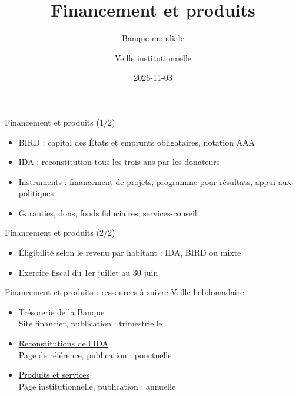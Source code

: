 \documentclass[aspectratio=169,11pt]{beamer}
\title{Financement et produits}
\subtitle{Banque mondiale}
\author{Veille institutionnelle}
\date{2026-11-03}
\begin{document}
\begin{frame}\titlepage\end{frame}

\begin{frame}{Financement et produits (1/2)}
\begin{itemize}
\item BIRD : capital des États et emprunts obligataires, notation AAA
\item IDA : reconstitution tous les trois ans par les donateurs
\item Instruments : financement de projets, programme-pour-résultats, appui aux politiques
\item Garanties, dons, fonds fiduciaires, services-conseil
\end{itemize}
\end{frame}

\begin{frame}{Financement et produits (2/2)}
\begin{itemize}
\item Éligibilité selon le revenu par habitant : IDA, BIRD ou mixte
\item Exercice fiscal du 1er juillet au 30 juin
\end{itemize}
\end{frame}

\begin{frame}{Financement et produits : ressources à suivre}
\small
Veille hebdomadaire.
\begin{itemize}
\item \href{https://treasury.worldbank.org}{Trésorerie de la Banque}\\{\footnotesize Site financier, publication : trimestrielle}
\item \href{https://ida.worldbank.org/en/replenishments}{Reconstitutions de l'IDA}\\{\footnotesize Page de référence, publication : ponctuelle}
\item \href{https://www.worldbank.org/en/projects-operations/products-and-services}{Produits et services}\\{\footnotesize Page institutionnelle, publication : annuelle}
\end{itemize}
\end{frame}
\end{document}
